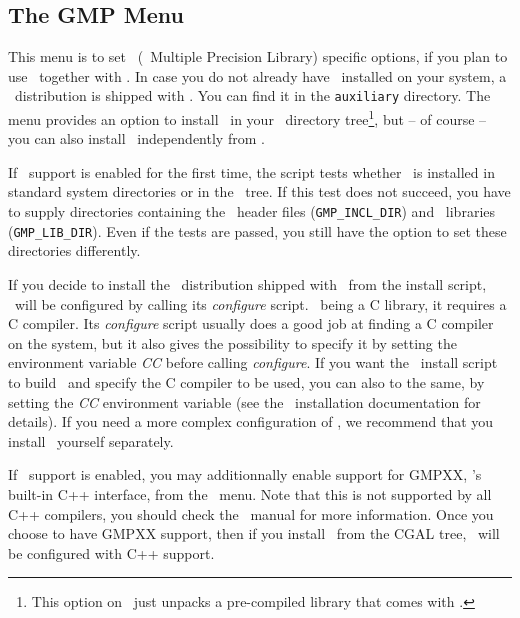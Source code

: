 \subsection{The GMP Menu}\label{sec:gmp-menu}

This menu is to set \gmp\ (\gnu\ Multiple Precision Library) specific
options, if you plan to use \gmp\ together with \cgal. In case you do
not already have \gmp\ installed on your system, a \gmp\ distribution
is shipped with \cgal. You can find it in the {\tt auxiliary}
directory. The menu provides an option to install \gmp\ in your \cgal\ 
directory tree\footnote{This option on \msvc\ just unpacks a
  pre-compiled library that comes with \cgal.}, but -- of course --
you can also install \gmp\ independently from \cgal.

If \gmp\ support is enabled for the first time, the script tests
whether \gmp\ is installed in standard system directories or in the
\cgal\ tree.  If this test does not succeed, you have to supply
directories containing the \gmp\ header files
(\texttt{GMP\_INCL\_DIR}) and \gmp\ libraries
({\tt GMP\_LIB\_DIR})\TTindex{GMP\_LIB\_DIR}.  Even if the tests are
passed, you still have the option to set these directories
differently.

If you decide to install the \gmp\ distribution shipped with \cgal\ 
from the install script, \gmp\ will be configured by calling its
\textit{configure} script. \gmp\ being a C library, it requires a C
compiler. Its \textit{configure} script usually does a good job at
finding a C compiler on the system, but it also gives the possibility
to specify it by setting the environment variable \textit{CC} before
calling \textit{configure}.  If you want the \cgal\ install script to
build \gmp\ and specify the C compiler to be used, you can also to the
same, by setting the \textit{CC} environment variable (see the \gmp\ 
installation documentation for details).  If you need a more complex
configuration of \gmp, we recommend that you install \gmp\ yourself
separately.

If \gmp\ support is enabled, you may additionnally enable support for
GMPXX, \gmp's built-in C++ interface, from the \gmp\ menu. Note that
this is not supported by all C++ compilers, you should check the \gmp\ 
manual for more information.  Once you choose to have GMPXX support,
then if you install \gmp\ from the CGAL tree, \gmp\ will be configured
with C++ support.\bigskip

